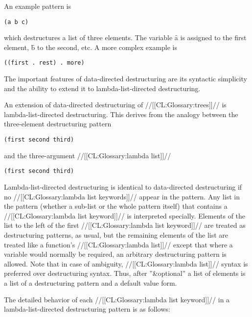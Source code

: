  

An example pattern is
 
{\tt 	(a b c)}
 
which destructures a list of three elements.  The variable \f{a} is assigned
to the first element, \f{b} to the second, etc.  A more complex example
is

{\tt 	((first . rest) . more)}
 
The important features of data-directed destructuring are its syntactic
simplicity and the ability to extend it to lambda-list-directed destructuring.

\endsubsubsubsubsection%

\endsubsubsubsection%


An extension of data-directed destructuring of //[[CL:Glossary:trees]]// is
lambda-list-directed destructuring.  This derives from the analogy
between the three-element destructuring pattern
 
{\tt 	(first second third)}
 
and the three-argument //[[CL:Glossary:lambda list]]//
 
{\tt	(first second third)}
 






Lambda-list-directed destructuring is identical to data-directed destructuring
if no //[[CL:Glossary:lambda list keywords]]// appear in the pattern.  
Any list in the pattern (whether a sub-list or the whole pattern itself)
that contains a //[[CL:Glossary:lambda list keyword]]// is interpreted specially.
Elements of the list to the left of the first
//[[CL:Glossary:lambda list keyword]]// are treated as destructuring patterns, as usual, but the
remaining elements of the list are treated like a function's 
//[[CL:Glossary:lambda list]]//
except that where a variable would normally be required, an arbitrary
destructuring pattern is allowed.  Note that in case of ambiguity,
//[[CL:Glossary:lambda list]]// syntax is preferred over destructuring syntax.  Thus, after
''&optional'' a list of elements is a list of a destructuring pattern
and a default value form.
 
The detailed behavior of each //[[CL:Glossary:lambda list keyword]]// in a 
lambda-list-directed destructuring
pattern is as follows:

